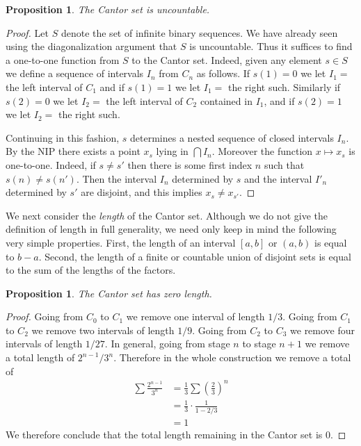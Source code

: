 \documentclass[11pt,oneside]{amsbook}
\theoremstyle{definition}
\theoremstyle{plain}
\newtheorem{proposition}[theorem]{Proposition}
\theoremstyle{definition}
\theoremstyle{remark}
\numberwithin{equation}{section}
\numberwithin{figure}{section}
\begin{document}
\begin{proposition}
  The Cantor set is uncountable.
\end{proposition}

\begin{proof}
  Let $S$ denote the set of infinite binary sequences. We have already seen using the diagonalization argument that $S$ is uncountable. Thus it suffices to find a one-to-one function from $S$ to the Cantor set. Indeed, given any element $s\in S$ we define a sequence of intervals $I_n$ from $C_n$ as follows. If $s(1)=0$ we let $I_1=$ the left interval of $C_1$ and if $s(1)=1$ we let $I_1=$ the right such. Similarly if $s(2)=0$ we let $I_2=$ the left interval of $C_2$ contained in $I_1$, and if $s(2)=1$ we let $I_2=$ the right such.

  Continuing in this fashion, $s$ determines a nested sequence of closed intervals $I_n$. By the NIP there exists a point $x_s$ lying in $\bigcap I_n$. Moreover the function $x\mapsto x_s$ is one-to-one. Indeed, if $s\neq s'$ then there is some first index $n$ such that $s(n)\neq s(n')$. Then the interval $I_n$ determined by $s$ and the interval $I'_n$ determined by $s'$ are disjoint, and this implies $x_s\neq x_{s'}$.
\end{proof}

We next consider the \emph{length} of the Cantor set. Although we do not give the definition of length in full generality, we need only keep in mind the following very simple properties. First, the length of an interval $[a,b]$ or $(a,b)$ is equal to $b-a$. Second, the length of a finite or countable union of disjoint sets is equal to the sum of the lengths of the factors.

\begin{proposition}
  The Cantor set has zero length.
\end{proposition}

\begin{proof}
  Going from $C_0$ to $C_1$ we remove one interval of length $1/3$. Going from $C_1$ to $C_2$ we remove two intervals of length $1/9$. Going from $C_2$ to $C_3$ we remove four intervals of length $1/27$. In general, going from stage $n$ to stage $n+1$ we remove a total length of $2^{n-1}/3^n$. Therefore in the whole construction we remove a total of
  \begin{align*}
    \sum\frac{2^{n-1}}{3^n}&=\frac13\sum\left(\frac23\right)^n\\
                           &=\frac13\cdot\frac{1}{1-2/3}\\
                           &=1
  \end{align*}
  We therefore conclude that the total length remaining in the Cantor set is $0$.
\end{proof}
\end{document}
